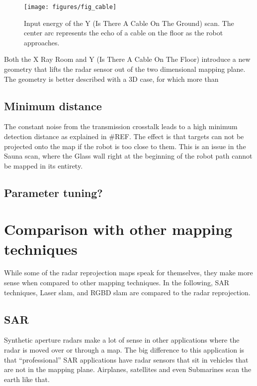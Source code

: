\begin{figure}[htp]
    \centering
    \texttt{[image: figures/fig\_cable]}
    \caption{Input energy of the Y (Is There A Cable On The Ground) scan. The center arc represents the echo of a cable on the floor as the robot approaches.}
    \label{fig:cable}
\end{figure}

Both the X Ray Room and Y (Is There A Cable On The Floor) introduce a
new geometry that lifts the radar sensor out of the two dimensional
mapping plane. The geometry is better described with a 3D case, for
which more than

\subsection{Minimum distance}\label{minimum-distance}

The constant noise from the transmission crosstalk leads to a high
minimum detection distance as explained in \#REF. The effect is that
targets can not be projected onto the map if the robot is too close to
them. This is an issue in the Sauna scan, where the Glass wall right at
the beginning of the robot path cannot be mapped in its entirety.

\subsection{Parameter tuning?}\label{parameter-tuning}



\section{Comparison with other mapping
techniques}\label{comparison-with-other-mapping-techniques}

While some of the radar reprojection maps speak for themselves, they
make more sense when compared to other mapping techniques. In the
following, SAR techniques, Laser slam, and RGBD slam are compared to the
radar reprojection.

\subsection{SAR}\label{sar-1}

Synthetic aperture radars make a lot of sense in other applications
where the radar is moved over or through a map. The big difference to
this application is that ``professional'' SAR applications have radar
sensors that sit in vehicles that are not in the mapping plane.
Airplanes, satellites and even Submarines scan the earth like that.

